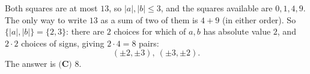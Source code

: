 Both squares are at most $13$, so $|a|,|b|\le3$, and the squares available are $0,1,4,9$. The only way to write $13$ as a sum of two of them is $4+9$ (in either order). So $\{|a|,|b|\}=\{2,3\}$: there are $2$ choices for which of $a,b$ has absolute value $2$, and $2\cdot2$ choices of signs, giving $2\cdot4=8$ pairs:
\[(\pm2,\pm3),\ (\pm3,\pm2).\]
The answer is $\boxed{\textbf{(C) }8}$.
